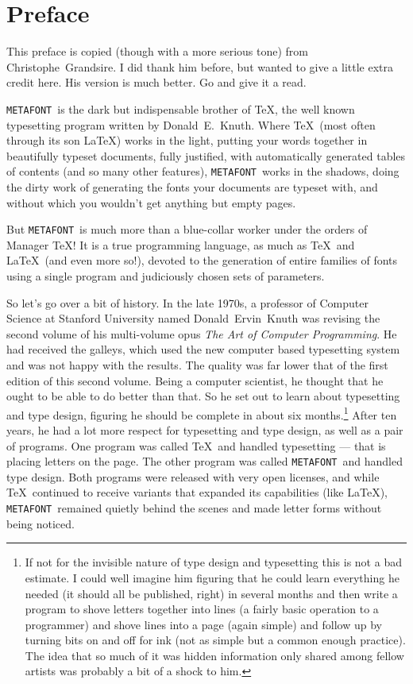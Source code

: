 \documentclass[a4paper,11pt,twoside]{book}
\newcommand{\MF}{{\tt METAFONT}}
\begin{document}
\chapter{Preface}

\begin{framed}
This preface is copied (though with a more serious tone) from Christophe~Grandsire.
I did thank him before, but wanted to give a little extra credit here.
His version is much better.
Go and give it a read.
\end{framed}

\MF\ is the dark but indispensable brother of \TeX, the well known typesetting program written by
Donald~E.~Knuth.
Where \TeX\ (most often through its son \LaTeX) works in the light, putting your words together in
beautifully typeset documents, fully justified, with automatically generated tables of contents
(and so many other features), \MF\ works in the shadows, doing the dirty work of generating the
fonts your documents are typeset with, and without which you wouldn't get anything but empty pages.

But \MF\ is much more than a blue-collar worker under the orders of Manager \TeX! It is a true
programming language, as much as \TeX\ and \LaTeX\ (and even more so!), devoted to the generation
of entire families of fonts using a single program and judiciously chosen sets of parameters.

So let's go over a bit of history.
In the late 1970s, a professor of Computer Science at Stanford University named Donald~Ervin~Knuth
was revising the second volume of his multi-volume opus \textsl{The Art of Computer Programming}.
He had received the galleys, which used the new computer based typesetting system and was not
happy with the results.
The quality was far lower that of the first edition of this second volume.
Being a computer scientist, he thought that he ought to be able to do better than that.
So he set out to learn about typesetting and type design, figuring he should be complete in about
six months.\footnote{If not for the invisible nature of type design and typesetting this is not a
bad estimate.
I could well imagine him figuring that he could learn everything he needed (it should all be
published, right) in several months and then write a program to shove letters together into lines
(a fairly basic operation to a programmer) and shove lines into a page (again simple) and follow
up by turning bits on and off for ink (not as simple but a common enough practice).
The idea that so much of it was hidden information only shared among fellow artists was probably
a bit of a shock to him.}
After ten years, he had a lot more respect for typesetting and type design, as well as a pair of
programs.
One program was called \TeX\ and handled typesetting --- that is placing letters on the page.
The other program was called \MF\ and handled type design.
Both programs were released with very open licenses, and while \TeX\ continued to receive variants
that expanded its capabilities (like \LaTeX), \MF\ remained quietly behind the scenes and made
letter forms without being noticed.
\end{document}
